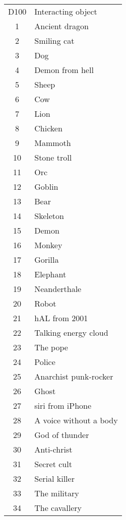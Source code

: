 \documentclass[11pt,a4paper,twocolumn]{article}
\begin{document}
\begin{tabular}{cl}
    \rowcolor{gray!50}
    D100 & Interacting object\\
    1 & Ancient dragon\\
    2 & Smiling cat\\
    3 & Dog\\
    4 & Demon from hell\\
    5 & Sheep\\
    6 & Cow\\
    7 & Lion\\
    8 & Chicken\\
    9 & Mammoth\\
    10 & Stone troll\\
    11 & Orc\\
    12 & Goblin\\
    13 & Bear\\
    14 & Skeleton\\
    15 & Demon\\
    16 & Monkey\\
    17 & Gorilla\\
    18 & Elephant\\
    19 & Neanderthale\\
    20 & Robot\\
    21 & hAL from 2001\\
    22 & Talking energy cloud\\
    23 & The pope\\
    24 & Police\\
    25 & Anarchist punk-rocker\\
    26 & Ghost\\
    27 & siri from iPhone\\
    28 & A voice without a body\\
    29 & God of thunder\\
    30 & Anti-christ\\
    31 & Secret cult\\
    32 & Serial killer\\
    33 & The military\\
    34 & The cavallery\\
\end{tabular}
\end{document}
